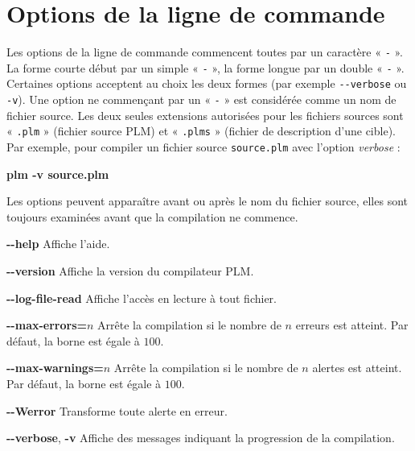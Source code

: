 




\chapter{Options de la ligne de commande}

Les options de la ligne de commande commencent toutes par un caractère « \texttt{-} ». La forme courte début par un simple « \texttt{-} », la forme longue par un double « \texttt{-} ». Certaines options acceptent au choix les deux formes (par exemple \texttt{-{}-verbose} ou \texttt{-v}). Une option ne commençant par un « \texttt{-} » est considérée comme un nom de fichier source. Les deux seules extensions autorisées pour les fichiers sources sont « \texttt{.plm} » (fichier source PLM) et  « \texttt{.plms} » (fichier de description d'une cible). Par exemple, pour compiler un fichier source \texttt{source.plm} avec l'option \emph{verbose} :

\begin{SHELL}
\bfseries plm -v source.plm
\end{SHELL}

Les options peuvent apparaître avant ou après le nom du fichier source, elles sont toujours examinées avant que la compilation ne commence.



{\ttfamily\bfseries-{}-help} Affiche l'aide.


{\ttfamily\bfseries-{}-version} Affiche la version du compilateur PLM.



{\ttfamily\bfseries-{}-log-file-read} Affiche l'accès en lecture à tout fichier.

{\ttfamily\bfseries-{}-max-errors=$n$} Arrête la compilation si le nombre de $n$ erreurs est atteint. Par défaut, la borne est égale à $100$.

{\ttfamily\bfseries-{}-max-warnings=$n$} Arrête la compilation si le nombre de $n$ alertes est atteint. Par défaut, la borne est égale à $100$.

{\ttfamily\bfseries-{}-Werror} Transforme toute alerte en erreur.

{\ttfamily\bfseries-{}-verbose}, {\ttfamily\bfseries-v} Affiche des messages indiquant la progression de la compilation.








